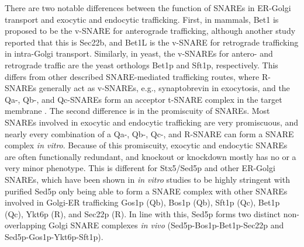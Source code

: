There are two notable differences between the function of SNAREs in ER-Golgi transport and exocytic and endocytic trafficking. First, in mammals, Bet1 is proposed to be the v-SNARE for anterograde trafficking\cite{malsam_organization_2011,zhang_mammalian_1997,xu_gs15_2002,volchuk_countercurrent_2004,tai_participation_2004}, although another study reported that this is Sec22b\cite{xu_subunit_2000}, and Bet1L is the v-SNARE for retrograde trafficking in intra-Golgi transport\cite{malsam_organization_2011,zhang_mammalian_1997,xu_gs15_2002,volchuk_countercurrent_2004,tai_participation_2004}. Similarly, in yeast, the v-SNAREs for antero- and retrograde traffic are the yeast orthologs Bet1p and Sft1p, respectively\cite{parlati_distinct_2002,banfield_snare-like_1995,parlati_topological_2000}. This differs from other described SNARE-mediated trafficking routes, where R-SNAREs generally act as v-SNAREs, e.g., synaptobrevin in exocytosis, and the Qa-, Qb-, and Qc-SNAREs form an acceptor t-SNARE complex in the target membrane \cite{dingjan_endosomal_2018,hong_snares_2005,jahn_snares_2006}. The second difference is in the promiscuity of SNAREs. Most SNAREs involved in exocytic and endocytic trafficking are very promiscuous, and nearly every combination of a Qa-, Qb-, Qc-, and R-SNARE can form a SNARE complex \emph{in vitro}\cite{dingjan_endosomal_2018}. Because of this promiscuity, exocytic and endocytic SNAREs are often functionally redundant, and knockout or knockdown mostly has no or a very minor phenotype\cite{dingjan_endosomal_2018}. This is different for Stx5/Sed5p and other ER-Golgi SNAREs, which have been shown in \emph{in vitro} studies to be highly stringent with purified Sed5p only being able to form a SNARE complex with other SNAREs involved in Golgi-ER trafficking Gos1p (Qb), Bos1p (Qb), Sft1p (Qc), Bet1p (Qc), Ykt6p (R), and Sec22p (R)\cite{furukawa_multiple_2014,tsui_selective_2001}. In line with this, Sed5p forms two distinct non-overlapping Golgi SNARE complexes \emph{in vivo} (Sed5p-Bos1p-Bet1p-Sec22p and Sed5p-Gos1p-Ykt6p-Sft1p)\cite{parlati_distinct_2002}. 

